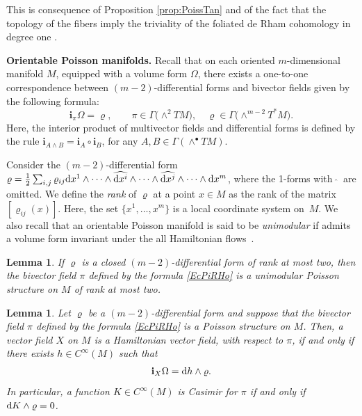 \documentclass[10pt,a4paper]{amsart}
\newcommand{\dd}{{\rm d}}
\newcommand{\ii}{\mathbf{i}}
\numberwithin{equation}{section}
\newtheorem{Lemma}[Theorem]{Lemma}
\begin{document}
This is consequence of Proposition \ref{prop:PoissTan} and of the fact that the topology of the fibers imply the triviality of the foliated de Rham cohomology in degree one \cite[Proposition~7.4]{DazHec-91}.

{\bf Orientable Poisson manifolds.} Recall that on each oriented $m$-dimensional manifold $M$, equipped with a volume form $\Omega$, there exists a one-to-one correspondence between $(m-2)$-differential forms and bivector fields given by the following formula:
 \begin{equation}\label{EcPiRHo}
 \ii_{\pi}\Omega = \varrho, \qquad \pi \in \Gamma\big({\wedge}^{2}TM\big),\quad \varrho \in \Gamma\big({\wedge}^{m-2}T^{\ast}M\big).
 \end{equation}
Here, the interior product of multivector fields and differential forms is defined by the rule $\ii_{A \wedge B} = \ii_{A} \circ \ii_{B}$, for any $A,B \in \Gamma(\wedge^{\bullet}TM)$.

Consider the $(m-2)$-differential form $\varrho = \frac{1}{2} \sum_{i,j} \varrho_{ij}\dd{x^{1}} \wedge \cdots \wedge \widehat{\dd{x^{i}}} \wedge \cdots \wedge \widehat{\dd{x^{j}}} \wedge \cdots \wedge \dd{x^{m}}$, where the 1-forms with $\ \widehat{}\ $ are omitted. We define the \emph{rank} of $\varrho$ at a point $x \in M$ as the rank of the matrix $[\varrho_{ij}(x)]$. Here, the set $\big\{x^{1},\dots,x^{m}\big\}$ is a local coordinate system on~$M$. We also recall that an orientable Poisson manifold is said to be \emph{unimodular} if admits a volume form invariant under the all Hamiltonian flows~\cite{We-97}.

\begin{Lemma}\label{lemma:RhoRank2}
If $\varrho$ is a closed $(m-2)$-differential form of rank at most two, then the bivector field $\pi$ defined by the formula \eqref{EcPiRHo} is a unimodular Poisson structure on $M$ of rank at most two.
\end{Lemma}

\begin{Lemma}\label{lemma:HamRho}
Let $\varrho$ be a $(m-2)$-differential form and suppose that the bivector field $\pi$ defined by the formula \eqref{EcPiRHo} is a Poisson structure on $M$. Then, a vector field $X$ on $M$ is a Hamiltonian vector field, with respect to $\pi$, if and only if there exists $h \in C^{\infty}(M)$ such that
 \begin{equation*}%
 \ii_{X}\Omega = \dd{h} \wedge \varrho.
 \end{equation*}
In particular, a function $K \in C^{\infty}(M)$ is Casimir for $\pi$ if and only if $\dd{K} \wedge \varrho = 0$.
\end{Lemma}
\end{document}
